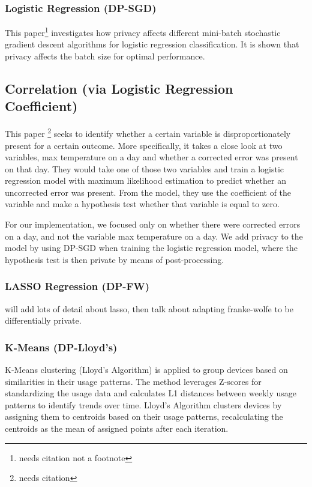 \documentclass[12pt,letterpaper]{article}
\begin{document}
\subsubsection{Logistic Regression (DP-SGD)}

This paper\footnote{needs citation not a footnote} investigates how privacy affects different mini-batch stochastic gradient descent algorithms for logistic regression classification. It is shown that privacy affects the batch size for optimal performance.

\subsection{Correlation (via Logistic Regression Coefficient)}

This paper \footnote{needs citation} seeks to identify whether a certain variable is disproportionately present for a certain outcome. 
More specifically, it takes a close look at two variables, max temperature on a day and whether a corrected error was present on that day. 
They would take one of those two variables and train a logistic regression model with maximum likelihood estimation to predict whether an uncorrected error was present.
From the model, they use the coefficient of the variable and make a hypothesis test whether that variable is equal to zero.

For our implementation, we focused only on whether there were corrected errors on a day, and not the variable max temperature on a day.
We add privacy to the model by using DP-SGD when training the logistic regression model, where the hypothesis test is then private by means of post-processing.

\subsubsection{LASSO Regression (DP-FW)}

will add lots of detail about lasso, then talk about adapting franke-wolfe to be differentially private. 

\subsubsection{K-Means (DP-Lloyd's)}
K-Means clustering (Lloyd's Algorithm) is applied to group devices based on similarities in their usage patterns. The method leverages Z-scores for standardizing the usage data and calculates L1 distances between weekly usage patterns to identify trends over time. Lloyd's Algorithm clusters devices by assigning them to centroids based on their usage patterns, recalculating the centroids as the mean of assigned points after each iteration. 
\end{document}
